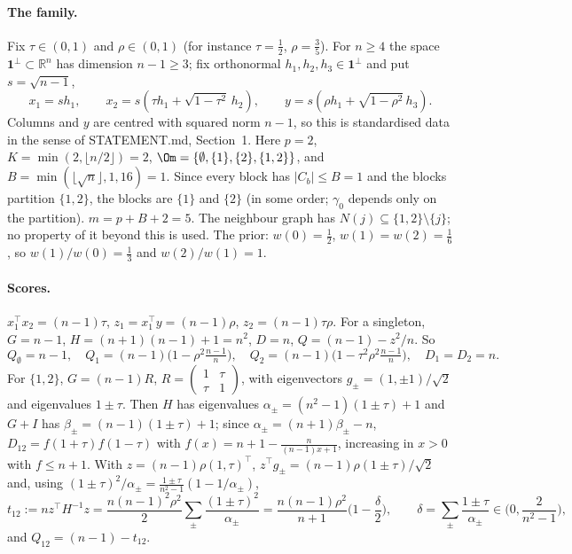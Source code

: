 \documentclass[11pt]{report}
\begin{document}
\paragraph{The family.} Fix $\tau\in(0,1)$ and $\rho\in(0,1)$ (for instance $\tau=\tfrac12$, $\rho=\tfrac35$). For $n\ge4$ the space $\mathbf 1^\perp\subset\mathbb R^n$ has dimension $n-1\ge3$; fix orthonormal $h_1,h_2,h_3\in\mathbf 1^\perp$ and put $s=\sqrt{n-1}$,
\[x_1=s h_1,\qquad x_2=s(\tau h_1+\sqrt{1-\tau^2}\,h_2),\qquad y=s(\rho h_1+\sqrt{1-\rho^2}\,h_3).\]
Columns and $y$ are centred with squared norm $n-1$, so this is standardised data in the sense of STATEMENT.md, Section~1. Here $p=2$, $K=\min(2,\lfloor n/2\rfloor)=2$, $\Om=\{\emptyset,\{1\},\{2\},\{1,2\}\}$, and $B=\min(\lfloor\sqrt n\rfloor,1,16)=1$. Since every block has $|C_b|\le B=1$ and the blocks partition $\{1,2\}$, the blocks are $\{1\}$ and $\{2\}$ (in some order; $\gamma_0$ depends only on the partition). $m=p+B+2=5$. The neighbour graph has $N(j)\subseteq\{1,2\}\setminus\{j\}$; no property of it beyond this is used. The prior: $w(0)=\tfrac12$, $w(1)=w(2)=\tfrac16$, so $w(1)/w(0)=\tfrac13$ and $w(2)/w(1)=1$.

\paragraph{Scores.} $x_1^\top x_2=(n-1)\tau$, $z_1=x_1^\top y=(n-1)\rho$, $z_2=(n-1)\tau\rho$. For a singleton, $G=n-1$, $H=(n+1)(n-1)+1=n^2$, $D=n$, $Q=(n-1)-z^2/n$. So
\[Q_\emptyset=n-1,\quad Q_1=(n-1)\Big(1-\rho^2\tfrac{n-1}{n}\Big),\quad Q_2=(n-1)\Big(1-\tau^2\rho^2\tfrac{n-1}{n}\Big),\quad D_1=D_2=n.\]
For $\{1,2\}$, $G=(n-1)R$, $R=\begin{pmatrix}1&\tau\\\tau&1\end{pmatrix}$, with eigenvectors $g_\pm=(1,\pm1)/\sqrt2$ and eigenvalues $1\pm\tau$. Then $H$ has eigenvalues $\alpha_\pm=(n^2-1)(1\pm\tau)+1$ and $G+I$ has $\beta_\pm=(n-1)(1\pm\tau)+1$; since $\alpha_\pm=(n+1)\beta_\pm-n$, $D_{12}=f(1+\tau)f(1-\tau)$ with $f(x)=n+1-\frac{n}{(n-1)x+1}$, increasing in $x>0$ with $f\le n+1$. With $z=(n-1)\rho(1,\tau)^\top$, $z^\top g_\pm=(n-1)\rho(1\pm\tau)/\sqrt2$ and, using $(1\pm\tau)^2/\alpha_\pm=\frac{1\pm\tau}{n^2-1}(1-1/\alpha_\pm)$,
\[t_{12}:=n z^\top H^{-1}z=\frac{n(n-1)^2\rho^2}{2}\sum_\pm\frac{(1\pm\tau)^2}{\alpha_\pm}=\frac{n(n-1)\rho^2}{n+1}\Big(1-\frac\delta2\Big),\qquad \delta=\sum_\pm\frac{1\pm\tau}{\alpha_\pm}\in\Big(0,\frac2{n^2-1}\Big),\]
and $Q_{12}=(n-1)-t_{12}$.
\end{document}
